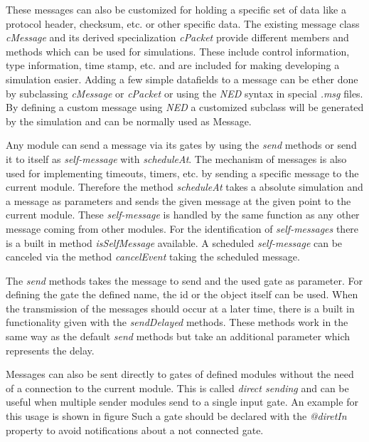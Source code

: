 These messages can also be customized for holding a specific set of data like a protocol header, checksum, etc. or other specific data.
The existing message class \emph{cMessage} and its derived specialization \emph{cPacket} provide different members and methods which can be used for simulations.
These include control information, type information, time stamp, etc. and are included for making developing a simulation easier.
Adding a few simple datafields to a message can be ether done by subclassing \emph{cMessage} or \emph{cPacket} or using the \emph{NED} syntax in special \emph{.msg} files.
By defining a custom message using \emph{NED} a customized subclass will be generated by the simulation and can be normally used as Message. %

Any module can send a message via its gates by using the \emph{send} methods or send it to itself as \emph{self-message} with \emph{scheduleAt}.
The mechanism of messages is also used for implementing timeouts, timers, etc. by sending a specific message to the current module.
Therefore the method \emph{scheduleAt} takes a absolute simulation and a message as parameters and sends the given message at the given point to the current module.
These \emph{self-message} is handled by the same function as any other message coming from other modules.
For the identification of \emph{self-messages} there is a built in method \emph{isSelfMessage} available.
A scheduled \emph{self-message} can be canceled via the method \emph{cancelEvent} taking the scheduled message. \cite[section 4.7.1]{omnet_manual}

The \emph{send} methods takes the message to send and the used gate as parameter.
For defining the gate the defined name, the id or the object itself can be used. \cite[section 4.7.2]{omnet_manual}
When the transmission of the messages should occur at a later time, there is a built in functionality given with the \emph{sendDelayed} methods.
These methods work in the same way as the default \emph{send} methods but take an additional parameter which represents the delay. \cite[section 4.7.6]{omnet_manual}

Messages can also be sent directly to gates of defined modules without the need of a connection to the current module.
This is called \emph{direct sending} and can be useful when multiple sender modules send to a single input gate.
An example for this usage is shown in figure 
Such a gate should be declared with the \emph{@diretIn} property to avoid notifications about a not connected gate. \cite[section 4.7.5]{omnet_manual}

